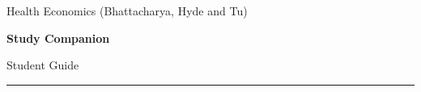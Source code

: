 \documentclass[11pt,a4paper]{article}
\begin{document}
\begin{center}
  {\sffamily\small\color{heconGray}Health Economics (Bhattacharya, Hyde and Tu)}\par\vspace{4pt}
  {\sffamily\Huge\bfseries\color{heconPrimary}Study Companion}\par\vspace{4pt}
  {\sffamily\Large\color{heconPrimary}Student Guide}\par\vspace{6pt}
  {\color{heconSecond}\rule{0.25\linewidth}{1.2pt}}
\end{center}

\end{document}

